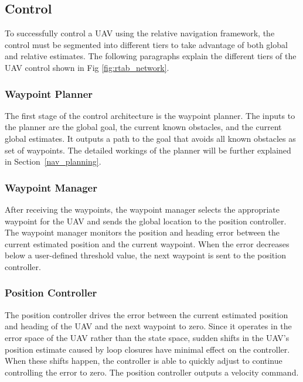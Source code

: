 \documentclass[letterpaper, 10 pt, conference]{ieeeconf}  %
\begin{document}
\subsection{Control}

To successfully control a UAV using the relative navigation framework, the control must be segmented into different tiers to take advantage of both global and relative estimates. The following paragraphs explain the different tiers of the UAV control shown in Fig \ref{fig:rtab_network}.

\subsubsection{Waypoint Planner}

The first stage of the control architecture is the waypoint planner. The inputs to the planner are the global goal, the current known obstacles, and the current global estimates. It outputs a path to the goal that avoids all known obstacles as set of waypoints. The detailed workings of the planner will be further explained in Section~\ref{nav_planning}.

\subsubsection{Waypoint Manager}

After receiving the waypoints, the waypoint manager selects the appropriate waypoint for the UAV and sends the global location to the position controller. The waypoint manager monitors the position and heading error between the current estimated position and the current waypoint. When the error decreases below a user-defined threshold value, the next waypoint is sent to the position controller.

\subsubsection{Position Controller}

The position controller drives the error between the current estimated position and heading of the UAV and the next waypoint to zero. Since it operates in the error space of the UAV rather than the state space, sudden shifts in the UAV's position estimate caused by loop closures have minimal effect on the controller. When these shifts happen, the controller is able to quickly adjust to continue controlling the error to zero. The position controller outputs a velocity command.
\end{document}
